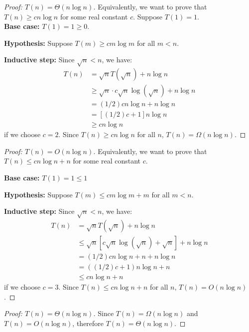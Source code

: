 \documentclass{article}
\begin{document}
\begin{itemize}
	\begin{mdframed}
	\begin{proof}[Proof: $T(n)=\Theta(n \log n)$]
	Equivalently, we want to prove that $T(n) \geq cn\log n$ for some real constant $c$. Suppose $T(1)=1$.\\
	{\bf Base case:} $T(1)=1 \geq 0$.
	
	{\bf Hypothesis:} Suppose $T(m)\geq cm\log m$ for all $m<n$.
	
	{\bf Inductive step:}
	Since $\sqrt{n}<n$, we have:
	\begin{align*}
	T(n)&=\sqrt{n}T(\sqrt{n})+n\log n \\
	& \geq \sqrt{n}\cdot c\sqrt{n}\log(\sqrt{n})+n\log n \\
	& = (1/2)cn\log n + n\log n \\
	&=[(1/2)c+1]n\log n \\
	&\geq cn\log n
	\end{align*}
	if we choose $c=2$. Since $T(n)\geq cn\log n$ for all $n$, $T(n)=\Omega(n\log n)$.
	\end{proof}
	\begin{proof}[Proof: $T(n)=O(n\log n)$]
	Equivalently, we want to prove that $T(n)\leq cn\log n+n$ for some real constant $c$.
	
	{\bf Base case:} $T(1)=1\leq 1 $
	
	{\bf Hypothesis:} Suppose $T(m)\leq cm\log m + m$ for all $m<n$.
	
	{\bf Inductive step:}
	Since $\sqrt{n}<n$, we have:
	\begin{align*}
	T(n)&=\sqrt{n}T(\sqrt{n})+n\log n \\
	&\leq \sqrt{n}[c\sqrt{n}\log(\sqrt{n})+\sqrt{n}]+n\log n \\
	&=(1/2)cn\log n + n + n\log n \\
	&=((1/2)c+1)n\log n + n \\
	&\leq cn\log n + n
	\end{align*}
	if we choose $c=3$. Since $T(n)\leq cn\log n + n$ for all $n$, $T(n)=O(n\log n)$.
	\end{proof}
	\begin{proof}[Proof: $T(n)=\Theta(n\log n)$]
	Since $T(n)=\Omega(n\log n)$ and $T(n)=O(n\log n)$, therefore $T(n)=\Theta(n\log n)$.
	\end{proof}
	\end{mdframed}
	
	\end{itemize}
	
\pagebreak
	
\end{document}
